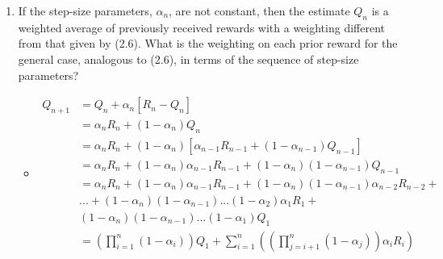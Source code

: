 \documentclass{article}
\begin{document}
\begin{enumerate}
    \item If the step-size parameters, $\alpha_n$, are not constant, then the estimate $Q_n$ is a weighted average of previously received rewards with a weighting different from that given by (2.6). What is the weighting on each prior reward for the general case, analogous to (2.6), in terms of the sequence of step-size parameters?
    \begin{itemize}
        \item \begin{align}
            Q_{n+1} &= Q_n + \alpha_n[R_n - Q_n] \\
            &= \alpha_n R_n + (1 - \alpha_n) Q_n \\
            &= \alpha_n R_n + (1 - \alpha_n)[\alpha_{n-1} R_{n-1} + (1 - \alpha_{n-1}) Q_{n-1}] \\
            &= \alpha_n R_n + (1 - \alpha_n)\alpha_{n-1} R_{n-1} + (1 - \alpha_n)(1 - \alpha_{n-1}) Q_{n-1} \\
            &= \alpha_n R_n + (1 - \alpha_n)\alpha_{n-1} R_{n-1} + (1 - \alpha_n)(1 - \alpha_{n-1}) \alpha_{n - 2}R_{n-2} + \\&... + (1-\alpha_n)(1-\alpha_{n-1})...(1-\alpha_2)\alpha_1 R_1 +\\& (1-\alpha_n)(1-\alpha_{n-1})...(1-\alpha_1)Q_1  \\
            &= \left( \prod^{n}_{i=1}(1-\alpha_i) \right) Q_1 + \sum^{n}_{i=1} \left(\left( \prod^{n}_{j=i+1}(1-\alpha_j) \right)\alpha_{i} R_i \right)
        \end{align}
    \end{itemize}


\end{enumerate}
\end{document}
